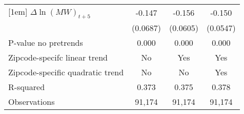 {\begin{tabular}{l*{3}{c}}
[1em]
$\Delta \ln(MW)_{t+5}$&   -0.147\sym{**} &   -0.156\sym{**} &   -0.150\sym{***}\\
          & (0.0687)         & (0.0605)         & (0.0547)         \\
\hline
P-value no pretrends&    0.000         &    0.000         &    0.000         \\
Zipcode-specifc linear trend&       No         &      Yes         &      Yes         \\
Zipcode-specific quadratic trend&       No         &       No         &      Yes         \\
R-squared &    0.373         &    0.375         &    0.378         \\
Observations&   91,174         &   91,174         &   91,174         \\
\hline\hline
\end{tabular}
}

